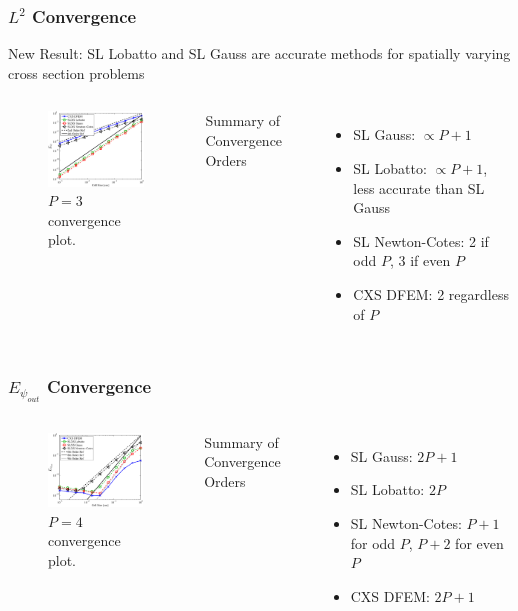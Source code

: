 \documentclass{beamer}
\begin{document}
\begin{frame}
\frametitle{$L^2$ Convergence}
New Result: SL Lobatto and SL Gauss are accurate methods for spatially varying cross section problems
\begin{columns}[c]
\begin{figure}
\includegraphics[width=5cm]{P3_VarXS_E_psi_L2.eps}
\caption{$P=3$ convergence plot.}
\end{figure}
Summary of Convergence Orders
\begin{itemize}
\item SL Gauss: $\propto P+1$
\item SL Lobatto: $\propto P+1$, less accurate than SL Gauss
\item SL Newton-Cotes: 2 if odd $P$, 3 if even $P$
\item CXS DFEM: 2 regardless of $P$
\end{itemize}
\end{columns}
\end{frame}

\begin{frame}
\frametitle{$E_{\psi_{out}}$ Convergence}
\begin{columns}[c]
\begin{figure}
\includegraphics[width=5cm]{P4_VarXS_E_psi_out.eps}
\caption{$P=4$ convergence plot.}
\end{figure}
Summary of Convergence Orders
\begin{itemize}
\item SL Gauss: $2P+1$
\item SL Lobatto: $2P$
\item SL Newton-Cotes: $P+1$ for odd $P$,   $P+2$ for even $P$
\item CXS DFEM: $2P+1$
\end{itemize}
\end{columns}
\end{frame}
\end{document}
